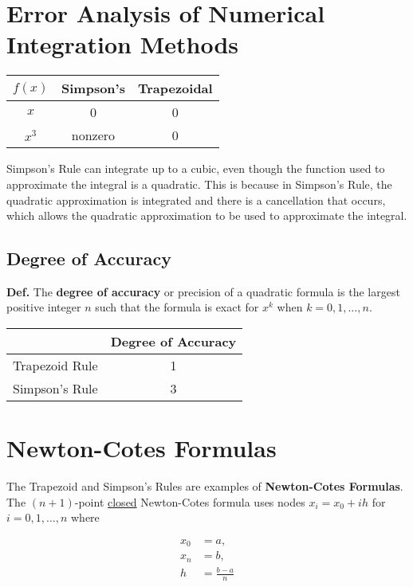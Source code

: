 \documentclass[12pt]{article}
\newcommand{\defn}{\textbf{Def.}\xspace}
\begin{document}
\section{Error Analysis of Numerical Integration Methods}
\label{sec:error_analysis}

\begin{center}
  \begin{tabular}{c|c|c}
    $f(x)$ & Simpson's & Trapezoidal \\ 
    \hline
    $x$ & 0 & 0 \\
    $x^3$ & nonzero & 0
  \end{tabular}
\end{center}

Simpson's Rule can integrate up to a cubic, even though the function used to
approximate the integral is a quadratic.  This is because in Simpson's Rule,
the quadratic approximation is integrated and there is a cancellation that
occurs, which allows the quadratic approximation to be used to approximate
the integral.

\subsection{Degree of Accuracy}
\label{sec:degree_of_accuracy}

\defn The \textbf{degree of accuracy} or precision of a quadratic formula is the largest
positive integer $n$ such that the formula is exact for $x^k$ when $k=0,1,\dots,n$.

\begin{center}
  \begin{tabular}{c|c}
    & Degree of Accuracy \\ \hline
    Trapezoid Rule & 1 \\
    Simpson's Rule & 3 \\
  \end{tabular}
\end{center}

\section{Newton-Cotes Formulas}
\label{sec:newton_cotes_formulas}

The Trapezoid and Simpson's Rules are examples of \textbf{Newton-Cotes
Formulas}. The $(n+1)$-point \uline{closed} Newton-Cotes formula uses nodes $x_i
= x_0+ih$ for $i=0,1,\dots,n$ where 

\begin{align*}
  x_0 &= a, \\
  x_n &= b, \\
  h &= \frac{b-a}{n}
\end{align*}
\end{document}
